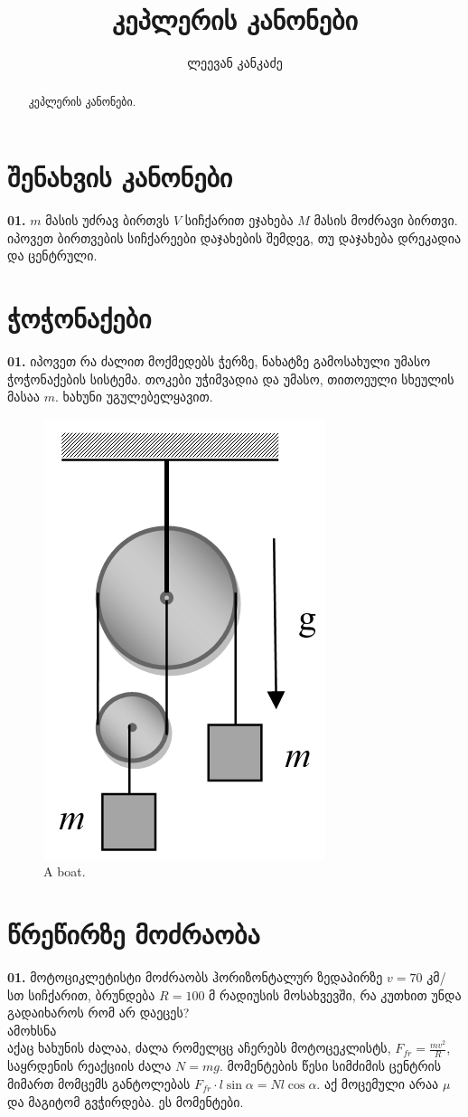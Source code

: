 \documentclass[a4paper]{article}
\title{კეპლერის კანონები}
\author{ლეევან კანკაძე}
\begin{document}
	\maketitle
	
	\begin{abstract}
		კეპლერის კანონები.
	\end{abstract}
	
	\section{შენახვის კანონები}
	\textbf{01.} $m$ მასის უძრავ ბირთვს $V$ სიჩქარით ეჯახება $M$ მასის მოძრავი ბირთვი. იპოვეთ ბირთვების სიჩქარეები დაჯახების შემდეგ, თუ დაჯახება დრეკადია და ცენტრული.  
		
	\section{ჭოჭონაქები}
	\textbf{01.} იპოვეთ რა ძალით მოქმედებს ჭერზე, ნახატზე გამოსახული უმასო ჭოჭონაქების სისტემა. თოკები უჭიმვადია და უმასო,  თითოეული სხეულის მასაა $m$.  ხახუნი უგულებელყავით.
	 			\begin{figure}[H]
	 			\centering
           \includegraphics[width=0.2\columnwidth]{figures/03}
           \caption{A boat.}
           \label{fig:boat1}
        \end{figure}
	 
	\section{წრეწირზე მოძრაობა}
	 \textbf{01.} მოტოციკლეტისტი მოძრაობს ჰორიზონტალურ ზედაპირზე $v = 70$ კმ/სთ სიჩქარით, ბრუნდება $R = 100$ მ რადიუსის მოსახვევში, რა კუთხით უნდა გადაიხაროს რომ არ დაეცეს? \\
	 ამოხსნა\\
	 აქაც ხახუნის ძალაა, ძალა რომელცც აჩერებს მოტოცეკლისტს, $F_{fr} = \frac{m v^2}{R}$, საყრდენის რეაქციის ძალა $N = mg$. მომენტების წესი სიმძიმის ცენტრის მიმართ მომცემს განტოლებას $F_{fr}\cdot l \sin \alpha = N l \cos \alpha$. აქ მოცემული არაა $\mu$ და მაგიტომ გვჭირდება. ეს მომენტები.
	 
\end{document}
